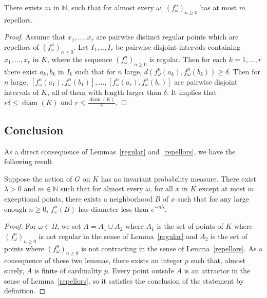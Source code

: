 \documentclass[AHL,Unicode,longabstracts,published]{cedram}
\DeclareMathOperator{\diam}{diam}
\newcommand{\N}{\mathbb{N}}
\begin{document}
\begin{lemm}\label{repellors}
There exists $m$ in $\N$, such that for almost every $\omega$, $(f_\omega^n)_{n \geq 0}$ has at most $m$ repellors.
\end{lemm}
\begin{proof}
Assume that $x_1,\dots, x_r$ are pairwise distinct regular points which are repellors of $(f_\omega^n)_{n\geq 0}$. Let $I_1,..,I_r$ be pairwise disjoint intervals containing $x_1,\dots, x_r$ in $K$, where the sequence $(f_\omega^n)_{n \geq 0}$ is regular. Then for each $k=1,\dots,r$ there exist $a_k,b_k$ in $I_k$ such that for $n$ large, $d(f_\omega^n(a_k),f_\omega^n(b_k))\geq \delta$. Then for $n$ large, $[f_\omega^n(a_1),f_\omega^n(b_1)],\dots,[f_\omega^n(a_r),f_\omega^n(b_r)]$ are pairwise disjoint intervals of $K$, all of them with length larger than $\delta$. It implies that $r\delta\leq \diam(K)$ and $r \leq \frac{\diam(K)}{\delta}$.
\end{proof}


\subsection{Conclusion}

As a direct consequence of Lemmas~\ref{regular} and~\ref{repellors}, we have the following result.

\begin{prop}\label{semilocalcontr}
Suppose the action of $G$ on $K$ has no invariant probability measure. There exist $\lambda>0$ and $m\in \N$ such that for almost every $\omega$, for all $x$ in $K$ except at most $m$ exceptional points, there exists a neighborhood $B$ of $x$ such that for any large enough $n\geq 0$, $f_\omega^n(B)$ has diameter less than $e^{-n\lambda}$.
\end{prop}
\begin{proof}
For $\omega\in \Omega$, we set $A=A_1\cup A_2$ where $A_1$ is the set of points of $K$ where $(f_\omega^n)_{n \geq 0}$ is not regular in the sense of Lemma~\ref{regular} and $A_2$ is the set of points where $(f_\omega^n)_{n \geq 0}$ is not contracting in the sense of Lemma~\ref{repellors}. As a consequence of these two lemmas, there exists an integer $p$ such that, almost surely, $A$ is finite of cardinality $p$. Every point outside $A$ is an attractor in the sense of Lemma~\ref{repellors}, so it satisfies the conclusion of the statement by definition.
\end{proof}
\end{document}
